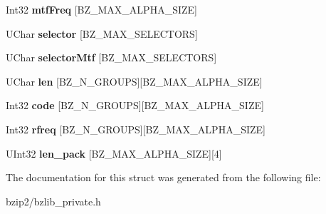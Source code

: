 \begin{DoxyCompactItemize}
\item 
Int32 {\bfseries mtf\+Freq} \mbox{[}B\+Z\+\_\+\+M\+A\+X\+\_\+\+A\+L\+P\+H\+A\+\_\+\+S\+I\+ZE\mbox{]}\hypertarget{struct_e_state_a0fa38a2a57e2a040fb71fda8fdef5894}{}\label{struct_e_state_a0fa38a2a57e2a040fb71fda8fdef5894}

\item 
U\+Char {\bfseries selector} \mbox{[}B\+Z\+\_\+\+M\+A\+X\+\_\+\+S\+E\+L\+E\+C\+T\+O\+RS\mbox{]}\hypertarget{struct_e_state_a0bd78fee5e462a5fd92ccb6eee6eaf38}{}\label{struct_e_state_a0bd78fee5e462a5fd92ccb6eee6eaf38}

\item 
U\+Char {\bfseries selector\+Mtf} \mbox{[}B\+Z\+\_\+\+M\+A\+X\+\_\+\+S\+E\+L\+E\+C\+T\+O\+RS\mbox{]}\hypertarget{struct_e_state_a67428eed73074a40558aa653a3f21d86}{}\label{struct_e_state_a67428eed73074a40558aa653a3f21d86}

\item 
U\+Char {\bfseries len} \mbox{[}B\+Z\+\_\+\+N\+\_\+\+G\+R\+O\+U\+PS\mbox{]}\mbox{[}B\+Z\+\_\+\+M\+A\+X\+\_\+\+A\+L\+P\+H\+A\+\_\+\+S\+I\+ZE\mbox{]}\hypertarget{struct_e_state_aa5f9af18cdba3dac5c071b915446c8c5}{}\label{struct_e_state_aa5f9af18cdba3dac5c071b915446c8c5}

\item 
Int32 {\bfseries code} \mbox{[}B\+Z\+\_\+\+N\+\_\+\+G\+R\+O\+U\+PS\mbox{]}\mbox{[}B\+Z\+\_\+\+M\+A\+X\+\_\+\+A\+L\+P\+H\+A\+\_\+\+S\+I\+ZE\mbox{]}\hypertarget{struct_e_state_a138b520fed9d5bbb10d830f1f4e4dab1}{}\label{struct_e_state_a138b520fed9d5bbb10d830f1f4e4dab1}

\item 
Int32 {\bfseries rfreq} \mbox{[}B\+Z\+\_\+\+N\+\_\+\+G\+R\+O\+U\+PS\mbox{]}\mbox{[}B\+Z\+\_\+\+M\+A\+X\+\_\+\+A\+L\+P\+H\+A\+\_\+\+S\+I\+ZE\mbox{]}\hypertarget{struct_e_state_a9a925e22f64a78c4a1080c66ffa0ef62}{}\label{struct_e_state_a9a925e22f64a78c4a1080c66ffa0ef62}

\item 
U\+Int32 {\bfseries len\+\_\+pack} \mbox{[}B\+Z\+\_\+\+M\+A\+X\+\_\+\+A\+L\+P\+H\+A\+\_\+\+S\+I\+ZE\mbox{]}\mbox{[}4\mbox{]}\hypertarget{struct_e_state_a2ab0ad3f8a3bb1b6e03977a26c2b64af}{}\label{struct_e_state_a2ab0ad3f8a3bb1b6e03977a26c2b64af}

\end{DoxyCompactItemize}


The documentation for this struct was generated from the following file\+:\begin{DoxyCompactItemize}
\item 
bzip2/bzlib\+\_\+private.\+h\end{DoxyCompactItemize}
